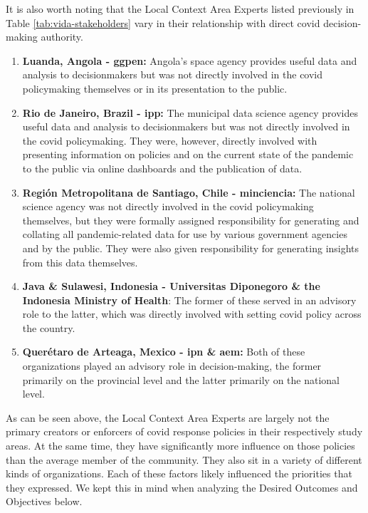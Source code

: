 It is also worth noting that the Local Context Area Experts listed previously in Table \ref{tab:vida-stakeholders} vary in their relationship with direct \ac{covid} decision-making authority. 

\begin{enumerate}[itemsep=0pt,parsep=0pt]
    \item{\textbf{Luanda, Angola - \ac{ggpen}:} Angola's space agency provides useful data and analysis to decisionmakers but was not directly involved in the \ac{covid} policymaking themselves or in its presentation to the public.}  
    \item{\textbf{Rio de Janeiro, Brazil - \ac{ipp}:} The municipal data science agency provides useful data and analysis to decisionmakers but was not directly involved in the \ac{covid} policymaking. They were, however, directly involved with presenting information on policies and on the current state of the pandemic to the public via online dashboards and the publication of data.}
    \item{\textbf{Región Metropolitana de Santiago, Chile - \ac{minciencia}:} The national science agency was not directly involved in the \ac{covid} policymaking themselves, but they were formally assigned responsibility for generating and collating all pandemic-related data for use by various government agencies and by the public. They were also given responsibility for generating insights from this data themselves.}
    \item{\textbf{Java \& Sulawesi, Indonesia - Universitas Diponegoro \& the Indonesia Ministry of Health}: The former of these served in an advisory role to the latter, which was directly involved with setting \ac{covid} policy across the country.}
    \item{\textbf{Querétaro de Arteaga, Mexico - \ac{ipn} \& \ac{aem}:} Both of these organizations played an advisory role in decision-making, the former primarily on the provincial level and the latter primarily on the national level.} 
\end{enumerate}

As can be seen above, the Local Context Area Experts are largely not the primary creators or enforcers of \ac{covid} response policies in their respectively study areas. At the same time, they have significantly more influence on those policies than the average member of the community. They also sit in a variety of different kinds of organizations. Each of these factors likely influenced the priorities that they expressed. We kept this in mind when analyzing the Desired Outcomes and Objectives below.

